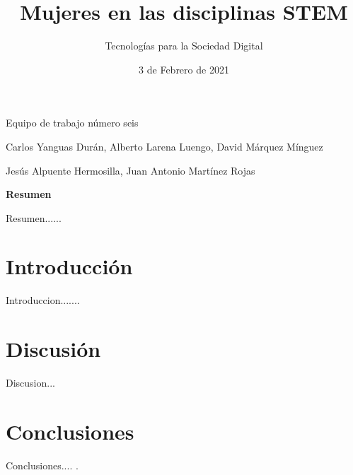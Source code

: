  

 

\graphicspath{{../Book/figures/}}

\title{Mujeres en las disciplinas STEM}
\date{3 de Febrero de 2021}            
\author{Tecnologías para la Sociedad Digital}




\maketitle
\begin{description}                               
  {        
  \item[Título en inglés:] \mybooktitleenglish   
  }                                            
  {                                           
  }                                              
\item[Equipo:] Equipo de trabajo número seis 
\item[Autores:] Carlos Yanguas Durán, Alberto Larena Luengo, David Márquez Mínguez                 
\item[\expandafter\makefirstuc\expandafter{\mybookTutorOrTutores}:] Jesús Alpuente Hermosilla, Juan Antonio Martínez Rojas      
\end{description}      
\setcounter{page}{1}


\begin{center}
 {\bfseries \Large Resumen}
\end{center}

Resumen......                      

\section{Introducción}
\label{sec:introduccion}

Introduccion.......


\section{Discusión}
\label{sec:discusion}

Discusion...

\section{Conclusiones}
\label{sec:conclusiones}
Conclusiones.... \cite{AMI}.

          


